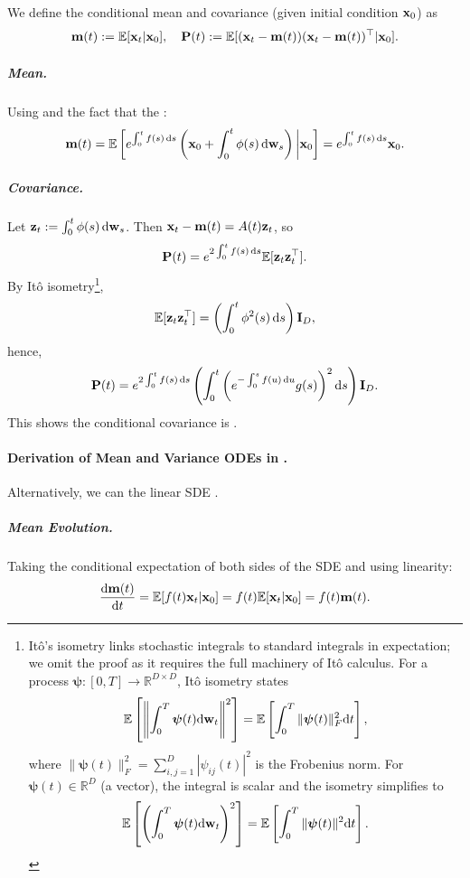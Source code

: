 We define the conditional mean and covariance (given initial condition ${\mathbf{x}}_0$) as
\[
{\mathbf{m}}(t) := \mathbb{E}[{\mathbf{x}}_t | {\mathbf{x}}_0], \quad {\mathbf{P}}(t) := \mathbb{E}[({\mathbf{x}}_t - {\mathbf{m}}(t))({\mathbf{x}}_t - {\mathbf{m}}(t))^\top|{\mathbf{x}}_0].
\]

\subparagraph{Mean.}
Using  and the fact that the :
\begin{align*}
    {\mathbf{m}}(t) = \mathbb{E}\left[ e^{\int_0^t f(s) \mathop{}\!\mathrm{d} s} \left( {\mathbf{x}}_0 + \int_0^t \phi(s) \mathop{}\!\mathrm{d} {\mathbf{w}}_s \right) \bigg| {\mathbf{x}}_0 \right] = e^{\int_0^t f(s) \mathop{}\!\mathrm{d} s} {\mathbf{x}}_0.
\end{align*}

\subparagraph{Covariance.}
Let  ${\mathbf{z}}_t := \int_0^t \phi(s) \mathop{}\!\mathrm{d} {\mathbf{w}}_s$. Then ${\mathbf{x}}_t - {\mathbf{m}}(t) = A(t) {\mathbf{z}}_t$, so
\[
{\mathbf{P}}(t) = e^{2\int_0^t f(s) \mathop{}\!\mathrm{d} s} \mathbb{E}[{\mathbf{z}}_t {\mathbf{z}}_t^\top].
\]
By It\^o isometry\footnote{It\^o's isometry links stochastic integrals to standard integrals in expectation; we omit the proof as it requires the full machinery of It\^o calculus. For a process $\bm{\psi} : [0,T] \to \mathbb{R}^{D \times D}$, It\^o isometry states
\[
\mathbb{E}\left[\left\| \int_0^T \bm{\psi}(t)   \mathrm{d}{\mathbf{w}}_t \right\|^2 \right]
= \mathbb{E}\left[\int_0^T \|\bm{\psi}(t)\|_F^2   \mathrm{d}t \right],
\]
where $\|\bm{\psi}(t)\|_F^2 = \sum_{i,j=1}^D |\psi_{ij}(t)|^2$ is the Frobenius norm. For $\bm{\psi}(t) \in \mathbb{R}^D$ (a vector), the integral is scalar and the isometry simplifies to
\[
\mathbb{E}\left[\left(\int_0^T \bm{\psi}(t)   \mathrm{d}{\mathbf{w}}_t\right)^2\right] = \mathbb{E}\left[\int_0^T \|\bm{\psi}(t)\|^2   \mathrm{d}t \right].
\]
},
\[
\mathbb{E}[{\mathbf{z}}_t {\mathbf{z}}_t^\top] = \left( \int_0^t \phi^2(s) \mathop{}\!\mathrm{d} s \right) {\mathbf{I}}_D,
\]
hence,
\[
{\mathbf{P}}(t) = e^{2\int_0^t f(s) \mathop{}\!\mathrm{d} s} \left( \int_0^t \left( e^{-\int_0^s f(u) \mathop{}\!\mathrm{d} u} g(s) \right)^2 \mathop{}\!\mathrm{d} s \right) {\mathbf{I}}_D.
\]
This shows the conditional covariance is .

\paragraph{Derivation of Mean and Variance ODEs in .}
Alternatively, we can  the linear SDE . 


\subparagraph{Mean Evolution.}
Taking the conditional expectation of both sides of the SDE and using linearity:
\[
\frac{\mathop{}\!\mathrm{d} {\mathbf{m}}(t)}{\mathop{}\!\mathrm{d} t} = \mathbb{E}[f(t) {\mathbf{x}}_t|{\mathbf{x}}_0] = f(t) \mathbb{E}[{\mathbf{x}}_t|{\mathbf{x}}_0] = f(t) {\mathbf{m}}(t).
\]

